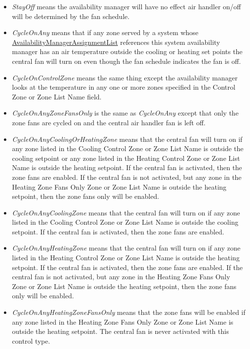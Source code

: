 \begin{itemize}
\tightlist
\item  \emph{StayOff} means the availability manager will have no effect air handler on/off will be determined by the fan schedule.
\item  \emph{CycleOnAny} means that if any zone served by a system whose \hyperref[availabilitymanagerassignmentlist]{AvailabilityManagerAssignmentList} references this system availability manager has an air temperature outside the cooling or heating set points the central fan will turn on even though the fan schedule indicates the fan is off.
\item  \emph{CycleOnControlZone} means the same thing except the availability manager looks at the temperature in any one or more zones specified in the Control Zone or Zone List Name field.
\item  \emph{CycleOnAnyZoneFansOnly} is the same as \emph{CycleOnAny} except that only the zone fans are cycled on and the central air handler fan is left off.
\item  \emph{CycleOnAnyCoolingOrHeatingZone} means that the central fan will turn on if any zone listed in the Cooling Control Zone or Zone List Name is outside the cooling setpoint or any zone listed in the Heating Control Zone or Zone List Name is outside the heating setpoint. If the central fan is activated, then the zone fans are enabled.  If the central fan is not activated, but any zone in the Heating Zone Fans Only Zone or Zone List Name is outside the heating setpoint, then the zone fans only will be enabled.
\item  \emph{CycleOnAnyCoolingZone} means that the central fan will turn on if any zone listed in the Cooling Control Zone or Zone List Name is outside the cooling setpoint. If the central fan is activated, then the zone fans are enabled.
\item  \emph{CycleOnAnyHeatingZone} means that the central fan will turn on if any zone listed in the Heating Control Zone or Zone List Name is outside the heating setpoint. If the central fan is activated, then the zone fans are enabled.   If the central fan is not activated, but any zone in the Heating Zone Fans Only Zone or Zone List Name is outside the heating setpoint, then the zone fans only will be enabled.
\item  \emph{CycleOnAnyHeatingZoneFansOnly} means that the zone fans will be enabled if any zone listed in the Heating Zone Fans Only Zone or Zone List Name is outside the heating setpoint. The central fan is never activated with this control type.
\end{itemize}


